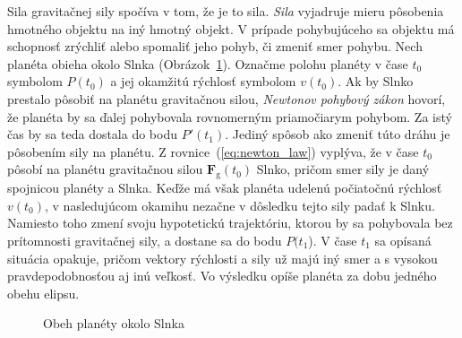 \documentclass[a4paper, 12pt]{book}
\newcommand{\gidx}{\mathrm g}
\let\vec\mathbf
\begin{document}
Sila gravitačnej sily spočíva v tom, že je to sila.  \emph{Sila} vyjadruje 
mieru pôsobenia hmotného objektu na iný hmotný objekt.  V prípade pohybujúceho 
sa objektu má schopnosť zrýchliť alebo spomaliť jeho pohyb, či zmeniť smer 
pohybu.  Nech planéta obieha okolo Slnka (Obrázok~\ref{fig:orbital_motion}).  
Označme polohu planéty v čase $t_0$ symbolom $P(t_0)$ a jej okamžitú rýchlosť 
symbolom $v(t_0)$.  Ak by Slnko prestalo pôsobiť na planétu gravitačnou silou, 
\emph{Newtonov pohybový zákon} hovorí, že planéta by sa ďalej pohybovala 
rovnomerným priamočiarym pohybom.  Za istý čas by sa teda dostala do bodu 
$P'(t_1)$.  Jediný spôsob ako zmeniť túto dráhu je pôsobením sily na planétu.  
Z rovnice~(\ref{eq:newton_law}) vyplýva, že v čase $t_0$ pôsobí na planétu 
gravitačnou silou $\vec F_\gidx(t_0)$ Slnko, pričom smer sily je daný spojnicou 
planéty a Slnka.  Keďže má však planéta udelenú počiatočnú rýchlosť $v(t_0)$, 
v nasledujúcom okamihu nezačne v dôsledku tejto sily padať k Slnku.  Namiesto 
toho zmení svoju hypotetickú trajektóriu, ktorou by sa pohybovala bez 
prítomnosti gravitačnej sily, a dostane sa do bodu $P(t_1$).  V čase $t_1$ sa 
opísaná situácia opakuje, pričom vektory rýchlosti a sily už majú iný smer 
a s vysokou pravdepodobnosťou aj inú veľkosť.  Vo výsledku opíše planéta za 
dobu jedného obehu elipsu.
%
\begin{figure}
\centering

\caption{Obeh planéty okolo Slnka}
\label{fig:orbital_motion}
\end{figure}
\end{document}

